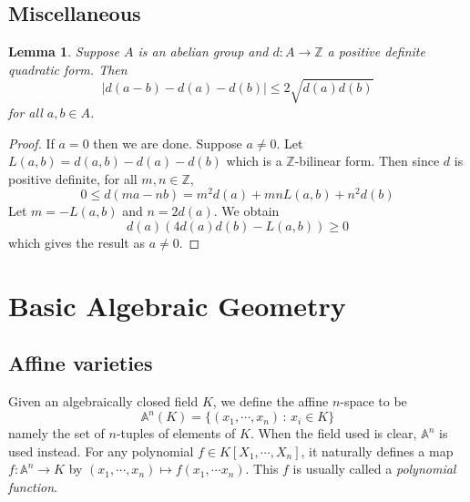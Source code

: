 \documentclass[12pt]{article}
\newtheorem{lemma}{Lemma}[subsection]
\theoremstyle{remark}
\theoremstyle{definition}
\newcommand{\Z}[0]{\mathbb{Z}}
\newcommand{\Ac}{\mathbb{A}}   %
\begin{document}
    \subsection{Miscellaneous}
    \begin{lemma}\label{lemma-cauchy-schwartz}
        Suppose $A$ is an abelian group and $d:A\to\Z$ a positive definite quadratic form. Then
        \[|d(a-b)-d(a)-d(b)|\leqslant2\sqrt{d(a)d(b)}\]
        for all $a, b\in A$.
    \end{lemma}
    \begin{proof}
        If $a=0$ then we are done. Suppose $a\neq 0$. Let $L(a, b)=d(a, b)-d(a)-d(b)$ which is a $\Z$-bilinear form. Then since $d$ is positive definite, for all $m,n\in\Z$,
        \[0\leqslant d(ma-nb)=m^2d(a)+mnL(a,b)+n^2d(b)\]
        Let $m=-L(a,b)$ and $n=2d(a)$. We obtain
        \[d(a)\left(4d(a)d(b)-L(a, b)\right)\geqslant 0\]
        which gives the result as $a\neq 0$.
    \end{proof}
    
    \section{Basic Algebraic Geometry}
    \subsection{Affine varieties}
        Given an algebraically closed field $K$, we define the affine $n$-space to be 
        $$\Ac^n(K) = \{(x_1, \cdots, x_n) \, : \, x_i \in K\}$$
        namely the set of $n$-tuples of elements of $K$. When the field used is clear, $\Ac^n$ is used instead. For any polynomial $f \in K[X_1, \cdots, X_n]$, it naturally defines a map $f : \Ac^n \rightarrow K$ by $(x_1, \cdots, x_n) \mapsto f(x_1, \cdots x_n)$. This $f$ is usually called a \textit{polynomial function}.
\end{document}
